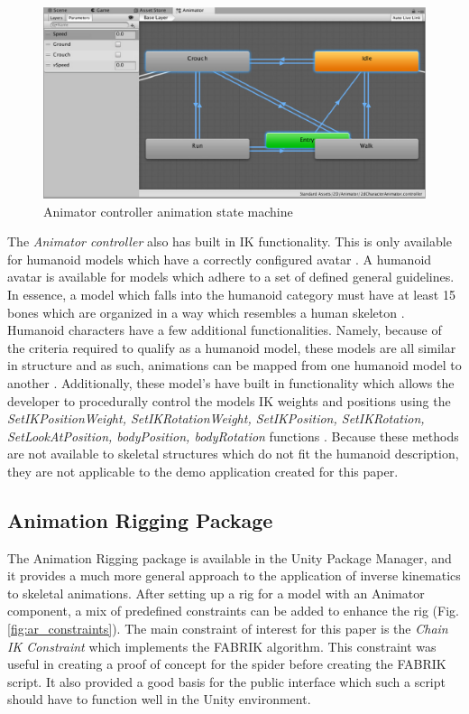 \begin{figure}
    \centering
    \includegraphics[width=\textwidth]{grafika/animator_controller.eps}
    \caption{Animator controller animation state machine \cite{unity_animator}}
    \label{fig:anim_state}
\end{figure}

The \textit{Animator controller} also has built in IK functionality. This is only
available for humanoid models which have a correctly configured avatar
\cite{unity_ik}. A humanoid avatar is available for models which adhere to a set
of defined general guidelines. In essence, a model which falls into the humanoid
category must have at least 15 bones which are organized in a way which
resembles a human skeleton \cite{unity_humanoid_import}. Humanoid characters
have a few additional functionalities. Namely, because of the criteria required
to qualify as a humanoid model, these models are all similar in structure and as
such, animations can be mapped from one humanoid model to another
\cite{unity_humanoid_avatars}. Additionally, these model's have built in
functionality which allows the developer to procedurally control the models IK
weights and positions using the \textit{SetIKPositionWeight,
SetIKRotationWeight, SetIKPosition, SetIKRotation, SetLookAtPosition,
bodyPosition, bodyRotation} functions \cite{unity_ik, unity_humanoid_avatars}.
Because these methods are not available to skeletal structures which do not fit
the humanoid description, they are not applicable to the demo application
created for this paper.

\subsection{Animation Rigging Package}

The Animation Rigging package is available in the Unity Package Manager, and it
provides a much more general approach to the application of inverse kinematics
to skeletal animations. After setting up a rig for a model with an Animator
component, a mix of predefined constraints can be added to enhance the rig
(Fig. \ref{fig:ar_constraints}). The main constraint of interest for this
paper is the \textit{Chain IK Constraint} which implements the FABRIK algorithm.
This constraint was useful in creating a proof of concept for the spider before
creating the FABRIK script. It also provided a good basis for the public
interface which such a script should have to function well in the Unity
environment.


